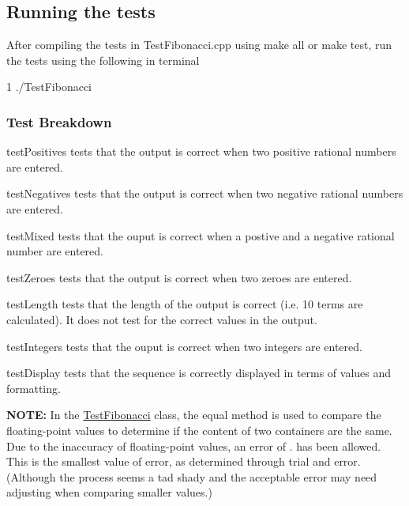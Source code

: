 \subsection*{Running the tests}

After compiling the tests in {\ttfamily Test\+Fibonacci.\+cpp} using {\ttfamily make all} or {\ttfamily make test}, run the tests using the following in terminal 
\begin{DoxyCode}
1 ./TestFibonacci
\end{DoxyCode}


\subsubsection*{Test Breakdown}


\begin{DoxyEnumerate}
\item {\ttfamily test\+Positives} tests that the output is correct when two positive rational numbers are entered.
\item {\ttfamily test\+Negatives} tests that the output is correct when two negative rational numbers are entered.
\item {\ttfamily test\+Mixed} tests that the ouput is correct when a postive and a negative rational number are entered.
\item {\ttfamily test\+Zeroes} tests that the output is correct when two zeroes are entered.
\item {\ttfamily test\+Length} tests that the length of the output is correct (i.\+e. 10 terms are calculated). It does not test for the correct values in the output.
\item {\ttfamily test\+Integers} tests that the ouput is correct when two integers are entered.
\item {\ttfamily test\+Display} tests that the sequence is correctly displayed in terms of values and formatting.
\end{DoxyEnumerate}

{\bfseries N\+O\+TE\+:} In the {\ttfamily \hyperlink{classTestFibonacci}{Test\+Fibonacci}} class, the {\ttfamily equal} method is used to compare the floating-\/point values to determine if the content of two containers are the same. Due to the inaccuracy of floating-\/point values, an error of {.} has been allowed. This is the smallest value of error, as determined through trial and error. (Although the process seems a tad shady and the acceptable error may need adjusting when comparing smaller values.)

